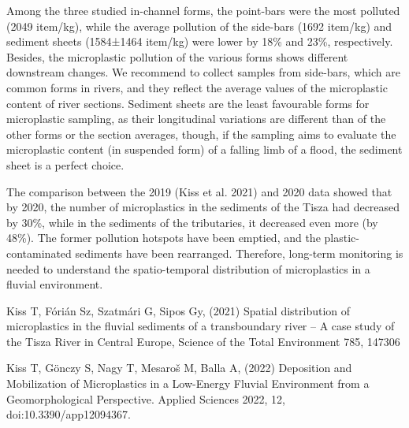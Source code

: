 {Among the three studied in-channel forms, the point-bars were the most polluted (2049 item/kg), while the average pollution of the side-bars (1692 item/kg) and sediment sheets (1584±1464 item/kg) were lower by 18\% and 23\%, respectively. Besides, the microplastic pollution of the various forms shows different downstream changes. We recommend to collect samples from side-bars, which are common forms in rivers, and they reflect the average values of the microplastic content of river sections. Sediment sheets are the least favourable forms for microplastic sampling, as their longitudinal variations are different than of the other forms or the section averages, though, if the sampling aims to evaluate the microplastic content (in suspended form) of a falling limb of a flood, the sediment sheet is a perfect choice.

The comparison between the 2019 (Kiss et al. 2021) and 2020 data showed that by 2020, the number of microplastics in the sediments of the Tisza had decreased by 30\%, while in the sediments of the tributaries, it decreased even more (by 48\%). The former pollution hotspots have been emptied, and the plastic-contaminated sediments have been rearranged. Therefore, long-term monitoring is needed to understand the spatio-temporal distribution of microplastics in a fluvial environment.
}
{Kiss T, Fórián Sz, Szatmári G, Sipos Gy, (2021) Spatial distribution of microplastics in the fluvial sediments of a transboundary river – A case study of the Tisza River in Central Europe, Science of the Total Environment 785, 147306

Kiss T, Gönczy S, Nagy T, Mesaroš M, Balla A, (2022) Deposition and Mobilization of Microplastics in a Low-Energy Fluvial Environment from a Geomorphological Perspective. Applied Sciences 2022, 12, doi:10.3390/app12094367.
}

